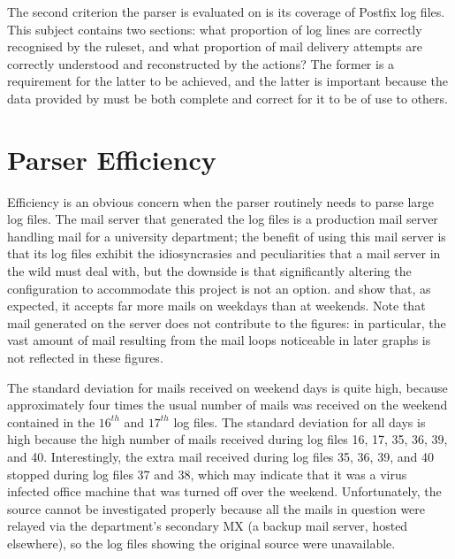 The second criterion the parser is evaluated on is its coverage of Postfix
log files.  This subject contains two sections: what proportion of log
lines are correctly recognised by the ruleset, and what proportion of mail
delivery attempts are correctly understood and reconstructed by the
actions?  The former is a requirement for the latter to be achieved, and
the latter is important because the data provided by \parsername{} must be
both complete and correct for it to be of use to others.

\section{Parser Efficiency}

\label{parser efficiency}

Efficiency is an obvious concern when the parser routinely needs to parse
large log files.  The mail server that generated the \numberOFlogFILES{}
log files is a production mail server handling mail for a university
department; the benefit of using this mail server is that its log files
exhibit the idiosyncrasies and peculiarities that a mail server in the wild
must deal with, but the downside is that significantly altering the
configuration to accommodate this project is not an option.
 and  show that, as expected, it accepts far more mails on
weekdays than at weekends.  Note that mail generated on the server does not
contribute to the figures: in particular, the vast amount of mail resulting
from the mail loops noticeable in later graphs is not reflected in these
figures.

The standard deviation for mails received on weekend days is
quite high, because approximately four times the usual number of mails was
received on the weekend contained in the $16^{th}$ and $17^{th}$ log files.
The standard deviation for all days is high because the high number of
mails received during log files 16, 17, 35, 36, 39, and 40.  Interestingly,
the extra mail received during log files 35, 36, 39, and 40 stopped during
log files 37 and 38, which may indicate that it was a virus infected office
machine that was turned off over the weekend.  Unfortunately, the source
cannot be investigated properly because all the mails in question were
relayed via the department's secondary MX (a backup mail server, hosted
elsewhere), so the log files showing the original source were unavailable.



